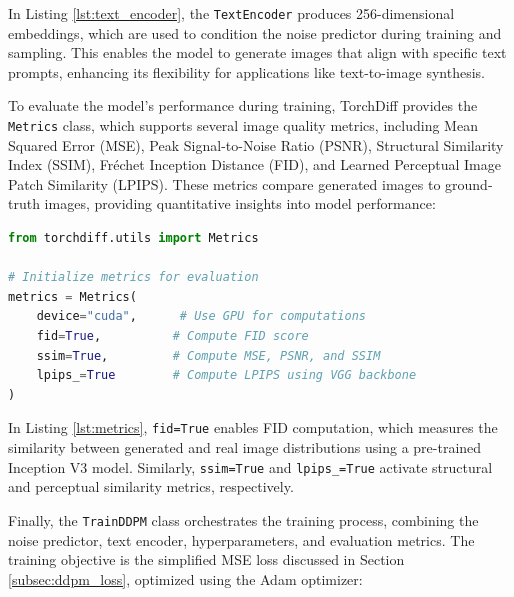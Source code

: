 \documentclass[12pt]{article}
\begin{document}
In Listing \ref{lst:text_encoder}, the \texttt{TextEncoder} produces 256-dimensional embeddings, which are used to condition the noise predictor during training and sampling. This enables the model to generate images that align with specific text prompts, enhancing its flexibility for applications like text-to-image synthesis.

To evaluate the model’s performance during training, TorchDiff provides the \texttt{Metrics} class, which supports several image quality metrics, including Mean Squared Error (MSE), Peak Signal-to-Noise Ratio (PSNR), Structural Similarity Index (SSIM), Fréchet Inception Distance (FID), and Learned Perceptual Image Patch Similarity (LPIPS). These metrics compare generated images to ground-truth images, providing quantitative insights into model performance:

\begin{lstlisting}[language=Python, caption={Configuring evaluation metrics.}, label={lst:metrics}]
from torchdiff.utils import Metrics

# Initialize metrics for evaluation
metrics = Metrics(
    device="cuda",      # Use GPU for computations
    fid=True,          # Compute FID score
    ssim=True,         # Compute MSE, PSNR, and SSIM
    lpips_=True        # Compute LPIPS using VGG backbone
)
\end{lstlisting}

In Listing \ref{lst:metrics}, \texttt{fid=True} enables FID computation, which measures the similarity between generated and real image distributions using a pre-trained Inception V3 model. Similarly, \texttt{ssim=True} and \texttt{lpips\_=True} activate structural and perceptual similarity metrics, respectively.

Finally, the \texttt{TrainDDPM} class orchestrates the training process, combining the noise predictor, text encoder, hyperparameters, and evaluation metrics. The training objective is the simplified MSE loss discussed in Section \ref{subsec:ddpm_loss}, optimized using the Adam optimizer:
\end{document}
